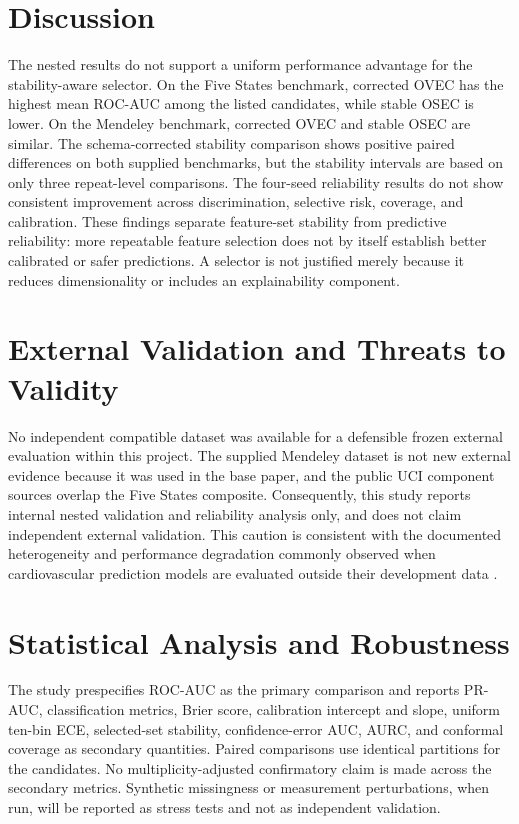 \documentclass[journal]{IEEEtran}
\begin{document}
\begin{table}[t]
\centering
\caption{Paired stability--reliability linkage. $\Phi$ is cross-seed selected-
set stability. $\Delta$ values are stable OSEC minus corrected OSEC means; the
full bootstrap intervals are stored in the machine-readable linkage artifacts.}
\label{tab:linkage}

\end{table}

\section{Discussion}
The nested results do not support a uniform performance advantage for the
stability-aware selector. On the Five States benchmark, corrected OVEC has the
highest mean ROC-AUC among the listed candidates, while stable OSEC is lower.
On the Mendeley benchmark, corrected OVEC and stable OSEC are similar. The
schema-corrected stability comparison shows positive paired differences on both
supplied benchmarks, but the stability intervals are based on only three
repeat-level comparisons. The four-seed reliability results do not show
consistent improvement across discrimination, selective risk, coverage, and
calibration. These findings separate feature-set stability from predictive
reliability: more repeatable feature selection does not by itself establish
better calibrated or safer predictions. A selector is not justified merely
because it reduces dimensionality or includes an explainability component.

\section{External Validation and Threats to Validity}
No independent compatible dataset was available for a defensible frozen
external evaluation within this project. The supplied Mendeley dataset is not
new external evidence because it was used in the base paper, and the public UCI
component sources overlap the Five States composite. Consequently, this study
reports internal nested validation and reliability analysis only, and does not
claim independent external validation. This caution is consistent with the
documented heterogeneity and performance degradation commonly observed when
cardiovascular prediction models are evaluated outside their development data
\cite{wessler2021external}.

\section{Statistical Analysis and Robustness}
The study prespecifies ROC-AUC as the primary comparison and reports PR-AUC,
classification metrics, Brier score, calibration intercept and slope, uniform
ten-bin ECE, selected-set stability, confidence-error AUC, AURC, and conformal
coverage as secondary quantities. Paired comparisons use identical partitions
for the candidates. No multiplicity-adjusted confirmatory claim is made across
the secondary metrics. Synthetic missingness or measurement perturbations,
when run, will be reported as stress tests and not as independent validation.
\end{document}
